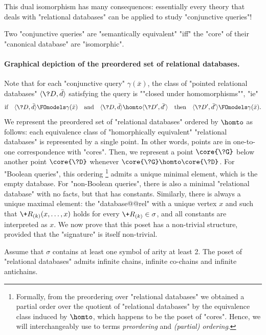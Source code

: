 This dual isomorphism has many consequences: essentially every theory that deals with
"relational databases" can be applied to study "conjunctive queries"!

\begin{corollary}
	Two "conjunctive queries" are "semantically equivalent" "iff"
	the "core" of their "canonical database" are "isomorphic".
\end{corollary}

\paragraph*{Graphical depiction of the preordered set of relational databases.}
Note that for each "conjunctive query" $\gamma(\bar x)$, the class of
"pointed relational databases" $\tup{\?D, \bar d}$ satisfying the query
is \AP""closed under homomorphisms"", "ie"
\[
	\text{if}\quad \tup{\?D, \bar d} \FOmodels \gamma(\bar x)
	\quad\text{and}\quad \tup{\?D, \bar d} \homto \tup{\?D', \bar d'}
	\quad\text{then}\quad \tup{\?D', \bar d'} \FOmodels \gamma(\bar x).
\]
We represent the preordered set of "relational databases" ordered by $\homto$ as follows:
each equivalence class of "homorphically equivalent" "relational databases" is
represented by a single point. In other words, points are in one-to-one correspondence
with "cores". Then, we represent a point $\core{\?G}$ below another point $\core{\?D}$
whenever $\core{\?G} \homto \core{\?D}$.
For "Boolean queries", this ordering%
\footnote{Formally, from the preordering over "relational databases" we obtained a partial
order over the quotient of "relational databases" by the equivalence class induced by $\homto$,
which happens to be the poset of "cores". Hence, we will interchangeably
use to terms \emph{preordering} and \emph{(partial) ordering}.}
admits a unique minimal element, which is the empty database.
For "non-Boolean queries", there is also a minimal "relational database" with
no facts, but that has constants.
Similarly, there is always a unique maximal element: the "database@@rel" with
a unique vertex $x$ and such that $\+R_{(k)}(x,\dotsc,x)$ holds for
every $\+R_{(k)} \in \sigma$, and all constants are interpreted as $x$.
We now prove that this poset has a non-trivial structure, provided that the "signature"
is itself non-trivial.

\begin{proposition}
	\AP\label{prop:poset-reldb}
	Assume that $\sigma$ contains at least one symbol of arity at least 2.
	The poset of "relational databases"
	admits infinite chains, infinite co-chains and infinite antichains.
\end{proposition}

